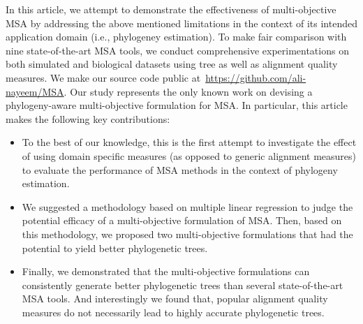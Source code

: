 In this article, we attempt to demonstrate the effectiveness of multi-objective MSA by addressing the above mentioned limitations in the context of its intended application domain (i.e., phylogeney estimation).
To make fair comparison with nine state-of-the-art MSA tools, we conduct comprehensive experimentations on both simulated and biological datasets using tree as well as alignment quality measures. 
We make our source code public at~\url{https://github.com/ali-nayeem/MSA}. Our study represents the only known work on devising a phylogeny-aware multi-objective formulation for MSA. In particular, this article makes the following key contributions:
\begin{itemize}
	\item To the best of our knowledge, this is the first attempt to investigate the effect of using domain specific measures (as opposed to generic alignment measures) to evaluate the performance of MSA methods in the context of phylogeny estimation.
	
	\item We suggested a methodology based on multiple linear regression to judge the potential efficacy of a multi-objective formulation of MSA. Then, based on this methodology, we proposed two multi-objective formulations that had the potential to yield better phylogenetic trees.
	
	\item Finally, we demonstrated that the multi-objective formulations can consistently generate better phylogenetic trees than several state-of-the-art MSA tools. And interestingly we found that, popular alignment quality measures do not necessarily lead to highly accurate phylogenetic trees. 
	
\end{itemize}
 